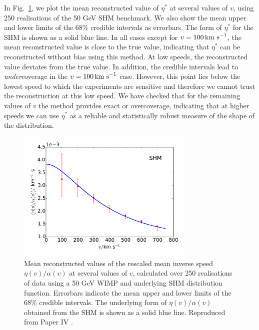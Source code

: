 In Fig.~\ref{fig:Poly:eta_stats}, we plot the mean reconstructed value of $\eta^*$ at several values of $v$, using 250 realisations of the 50 GeV SHM benchmark. We also show the mean upper and lower limits of the 68\% credible intervals as errorbars. The form of $\eta^*$ for the SHM is shown as a solid blue line. In all cases except for $v=100 \,\textrm{km s}^{-1}$, the mean reconstructed value is close to the true value, indicating that $\eta^*$ can be reconstructed without bias using this method. At low speeds, the reconstructed value deviates from the true value. In addition, the credible intervals lead to \textit{under}coverage in the $v=100 \,\textrm{km s}^{-1}$ case. However, this point lies below the lowest speed to which the experiments are sensitive and therefore we cannot trust the reconstruction at this low speed. We have checked that for the remaining values of $v$ the method provides exact or overcoverage, indicating that at higher speeds we can use $\eta^*$ as a reliable and statistically robust measure of the shape of the distribution.

\begin{figure}[t]
\centering
  \includegraphics[width=0.75\textwidth]{Poly/Eta.pdf}
  \caption[Mean reconstructed values of the rescaled mean inverse speed for a 50 GeV WIMP with SHM distribution function]{Mean reconstructed values of the rescaled mean inverse speed $\eta(v)/\alpha(v)$ at several values of $v$, calculated over 250 realisations of data using a 50 GeV WIMP and underlying SHM distribution function. Errorbars indicate the mean upper and lower limits of the 68\% credible intervals. The underlying form of $\eta(v)/\alpha(v)$ obtained from the SHM is shown as a solid blue line. Reproduced from Paper IV \cite{Kavanagh:2014}.}
  \label{fig:Poly:eta_stats}
\end{figure}


